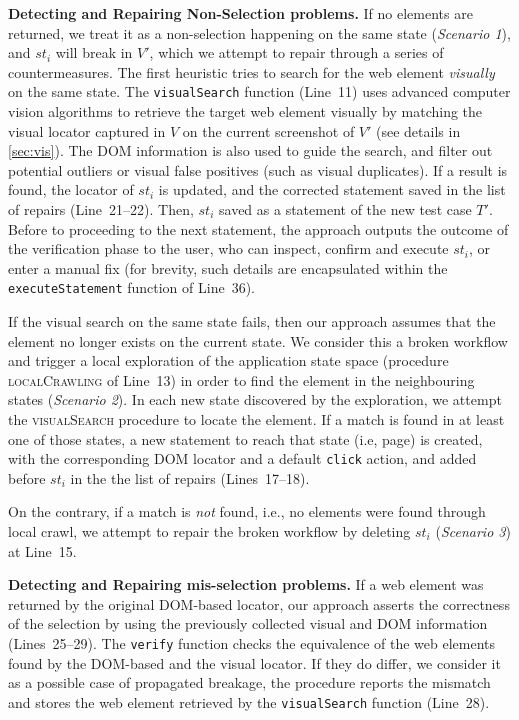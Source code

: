 

\noindent
\textbf{Detecting and Repairing Non-Selection problems.}
If no elements are returned, we treat it as a non-selection happening on the same state (\textit{Scenario 1}), and $st_i$ will break in $V'$, which we attempt to repair through a series of countermeasures. The first heuristic tries to search for the web element \textit{visually} on the same state. The \texttt{visualSearch} function (Line~11) uses advanced computer vision algorithms to retrieve the target web element visually by matching the visual locator captured in $V$ on the current screenshot of $V'$ (see details in \autoref{sec:vis}). The DOM information is also used to guide the search, and filter out potential outliers or visual false positives (such as visual duplicates). If a result is found, the locator of $st_i$ is updated, and the corrected statement saved in the list of repairs (Line~21--22). Then, $st_i$ saved as a statement of the new test case $T'$. Before to proceeding to the next statement, the approach outputs the outcome of the verification phase to the user, who can inspect, confirm and execute $st_i$, or enter a manual fix (for brevity, such details are encapsulated within the \texttt{executeStatement} function of Line~36).

If the visual search on the same state fails, then our approach assumes that the element no longer exists on the current state. We consider this a broken workflow and trigger a local exploration of the application state space (procedure \textsc{localCrawling} of Line~13) in order to find the element in the neighbouring states (\textit{Scenario 2}). In each new state discovered by the exploration, we attempt the \textsc{visualSearch} procedure to locate the element. If a match is found in at least one of those states, a new statement to reach that state (i.e, page) is created, with the corresponding DOM locator and a default \texttt{click} action, and added before $st_i$ in the the list of repairs (Lines~17--18).

On the contrary, if a match is \textit{not} found, i.e., no elements were found through local crawl, we attempt to repair the broken workflow by deleting $st_i$ (\textit{Scenario 3}) at Line~15.

\noindent
\textbf{Detecting and Repairing mis-selection problems.}
If a web element was returned by the original DOM-based locator, our approach asserts the correctness of the selection by using the previously collected visual and DOM information (Lines~25--29). 
The \texttt{verify} function checks the equivalence of the web elements found by the DOM-based and the visual locator. If they do differ, we consider it as a possible case of propagated breakage, the procedure reports the mismatch and stores the web element retrieved by the \texttt{visualSearch} function (Line~28).

